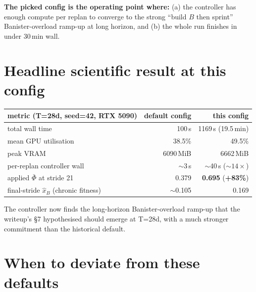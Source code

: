 \documentclass[11pt,a4paper]{article}
\begin{document}
\textbf{The picked config is the operating point where:} (a) the
controller has enough compute per replan to converge to the strong
``build $B$ then sprint'' Banister-overload ramp-up at long horizon,
and (b) the whole run finishes in under 30\,min wall.

\section*{Headline scientific result at this config}

\begin{tabular}{lrr}
\toprule
metric (T=28d, seed=42, RTX 5090) & default config & this config \\
\midrule
total wall time                         & 100\,s        & 1169\,s (19.5\,min) \\
mean GPU utilisation                    & 38.5\%        & 49.5\%   \\
peak VRAM                               & 6090\,MiB     & 6662\,MiB \\
per-replan controller wall              & $\sim$3\,s    & $\sim$40\,s ($\sim 14\times$) \\
applied $\bar\Phi$ at stride 21         & 0.379         & \textbf{0.695} (\textbf{+83\%}) \\
final-stride $\hat x_B$ (chronic fitness) & $\sim$0.105 & 0.169 \\
\bottomrule
\end{tabular}

The controller now finds the long-horizon Banister-overload ramp-up
that the writeup's §7 hypothesised should emerge at T=28d, with a much
stronger commitment than the historical default.

\section*{When to deviate from these defaults}
\end{document}
